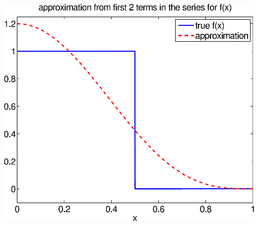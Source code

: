 {\begin{solution}
\begin{enumerate}
\begin{center}
   \includegraphics[scale=0.4]{bvps3_2b}


\end{center}
\end{enumerate}
\end{solution}}
